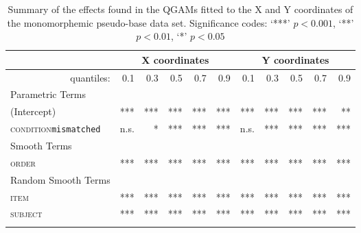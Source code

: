 \begin{table}[H]\fontsize{9}{10}
\caption{Summary of the effects found in the QGAMs fitted to the X and Y coordinates of the monomorphemic pseudo-base data set. Significance codes: `***' $p < 0.001$, `**' $p < 0.01$, `*' $p < 0.05$}
\label{tab:7.11}
\centering
\begin{tabular}{lrrrrrrrrrr}
\lsptoprule
~                   & \multicolumn{5}{c}{X coordinates}                              & \multicolumn{5}{c}{Y coordinates}                               \\
\midrule
\multicolumn{1}{r}{quantiles:}          & 0.1        & 0.3        & 0.5        & 0.7        & 0.9        & 0.1        & 0.3        & 0.5        & 0.7        & 0.9         \\
\midrule
Parametric Terms    & \textbf{~} & \textbf{~} & \textbf{~} & \textbf{~} & \textbf{~} & \textbf{~} & \textbf{~} & \textbf{~} & \textbf{~} & \textbf{~}  \\
\midrule
(Intercept)         & ***        & ***        & ***        & ***        & ***        & ***        & ***        & ***        & ***        & **          \\
\textsc{condition}\texttt{mismatched} & n.s.       & *          & ***        & ***        & ***        & n.s.       & ***        & ***        & ***        & ***         \\
\midrule
Smooth Terms        & \textbf{~} & \textbf{~} & \textbf{~} & \textbf{~} & \textbf{~} & \textbf{~} & \textbf{~} & \textbf{~} & \textbf{~} & \textbf{~}  \\
\midrule
\textsc{order}               & ***        & ***        & ***        & ***        & ***        & ***        & ***        & ***        & ***        & ***         \\
\midrule
Random Smooth Terms & \textbf{~} & \textbf{~} & \textbf{~} & \textbf{~} & \textbf{~} & \textbf{~} & \textbf{~} & \textbf{~} & \textbf{~} & \textbf{~}  \\
\midrule
\textsc{item}                & ***        & ***        & ***        & ***        & ***        & ***        & ***        & ***        & ***        & ***         \\
\textsc{subject}             & ***        & ***        & ***        & ***        & ***        & ***        & ***        & ***        & ***        & ***        \\
\lspbottomrule
\end{tabular}
\end{table}




